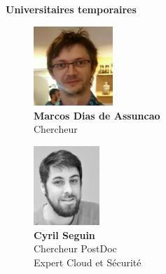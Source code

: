 \textbf{Universitaires temporaires}
\begin{figure}[h!]
	\begin{minipage}{0.48\textwidth}
		\centering
		\includegraphics[height=3cm]{partie1/images/marco.jpg}\\
		\textbf{Marcos Dias de Assuncao}\\
		Chercheur
	\end{minipage}\hfill
	\begin{minipage}{0.48\textwidth}
		\centering
		\includegraphics[height=3cm]{partie1/images/cyril.jpg}\\
		\textbf{Cyril Seguin}\\
		Chercheur PostDoc\\Expert Cloud et Sécurité
	\end{minipage}\hfill
\end{figure}

